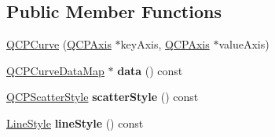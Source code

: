 \subsection*{Public Member Functions}
\begin{DoxyCompactItemize}
\item 
\hyperlink{classQCPCurve_a36de58e2652b3fa47bdf9187d421d3ce}{Q\+C\+P\+Curve} (\hyperlink{classQCPAxis}{Q\+C\+P\+Axis} $\ast$key\+Axis, \hyperlink{classQCPAxis}{Q\+C\+P\+Axis} $\ast$value\+Axis)
\item 
\hypertarget{classQCPCurve_a9ac194d35d4f334923aac9df1bf599ca}{}\hyperlink{qcustomplot_8h_a444d37ec9cb2951b3a7fe443c34d1658}{Q\+C\+P\+Curve\+Data\+Map} $\ast$ {\bfseries data} () const \label{classQCPCurve_a9ac194d35d4f334923aac9df1bf599ca}

\item 
\hypertarget{classQCPCurve_a9ab864c9f6ba0cedf65853f59d867a68}{}\hyperlink{classQCPScatterStyle}{Q\+C\+P\+Scatter\+Style} {\bfseries scatter\+Style} () const \label{classQCPCurve_a9ab864c9f6ba0cedf65853f59d867a68}

\item 
\hypertarget{classQCPCurve_a0314dd644258949aeb4a95cebde5abaf}{}\hyperlink{classQCPCurve_a2710e9f79302152cff794c6e16cc01f1}{Line\+Style} {\bfseries line\+Style} () const \label{classQCPCurve_a0314dd644258949aeb4a95cebde5abaf}


\end{DoxyCompactItemize}
